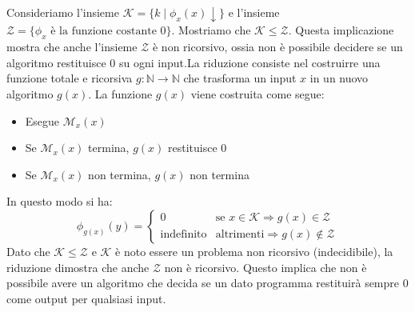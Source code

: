 \documentclass[12pt, a4paper]{report}
\begin{document}
                        \begin{example}
                            Consideriamo l'insieme $\mathcal{K}=\{k\mid\phi_x(x)\downarrow\}$ e l'insieme $\mathcal{Z}=\{\phi_x \text{ è la funzione costante } 0\}$. Mostriamo che $\mathcal{K}\leq\mathcal{Z}$. Questa implicazione mostra che anche l'insieme $\mathcal{Z}$ è non ricorsivo, ossia non è possibile decidere se un algoritmo restituisce 0 su ogni input.La riduzione consiste nel costruirre una funzione totale e ricorsiva $g:\mathbb{N}\to\mathbb{N}$ che trasforma un input $x$ in un nuovo algoritmo $g(x)$. La funzione $g(x)$ viene costruita come segue:
                            \begin{itemize}
                                \item Esegue $\mathcal{M}_x(x)$
                                \item Se $\mathcal{M}_x(x)$ termina, $g(x)$ restituisce 0
                                \item Se $\mathcal{M}_x(x)$ non termina, $g(x)$ non termina
                            \end{itemize}
                            In questo modo si ha:
                            $$
                            \phi_{g(x)}(y)=\begin{cases}
                                0 & \text{se } x\in\mathcal{K} \Rightarrow g(x)\in\mathcal{Z}\\
                                \text{indefinito} & \text{altrimenti}\Rightarrow g(x)\notin\mathcal{Z}
                            \end{cases}
                            $$
                            Dato che $\mathcal{K} \leq \mathcal{Z}$ e $\mathcal{K}$ è noto essere un problema non ricorsivo (indecidibile), la riduzione dimostra che anche $\mathcal{Z}$ non è ricorsivo. Questo implica che non è possibile avere un algoritmo che decida se un dato programma restituirà sempre 0 come output per qualsiasi input.
                        \end{example}
\end{document}
